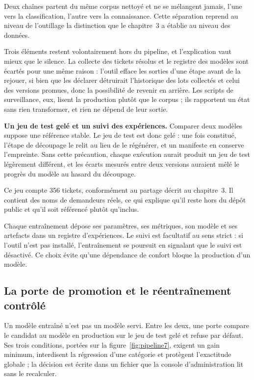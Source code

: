 Deux chaînes partent du même corpus nettoyé et ne se mélangent jamais, l'une vers la
classification, l'autre vers la connaissance. Cette séparation reprend au niveau de l'outillage la
distinction que le chapitre~3 a établie au niveau des données.

Trois éléments restent volontairement hors du pipeline, et l'explication vaut mieux que le silence.
La collecte des tickets résolus et le registre des modèles sont écartés pour une même raison :
l'outil efface les sorties d'une étape avant de la rejouer, si bien que les déclarer détruirait
l'historique des lots collectés et celui des versions promues, donc la possibilité de revenir en
arrière. Les scripts de surveillance, eux, lisent la production plutôt que le corpus ; ils
rapportent un état sans rien transformer, et rien ne dépend de leur sortie.

\textbf{Un jeu de test gelé et un suivi des expériences.} Comparer deux modèles suppose une référence stable. Le jeu de test est donc gelé : une fois
constitué, l'étape de découpage le relit au lieu de le régénérer, et un manifeste en conserve
l'empreinte. Sans cette précaution, chaque exécution aurait produit un jeu de test légèrement
différent, et les écarts mesurés entre deux versions auraient mêlé le progrès du modèle au hasard
du découpage.

Ce jeu compte 356 tickets, conformément au partage décrit au chapitre~3. Il contient des noms de
demandeurs réels, ce qui explique qu'il reste hors du dépôt public et qu'il soit référencé plutôt
qu'inclus.

Chaque entraînement dépose ses paramètres, ses métriques, son modèle et ses artefacts dans un
registre d'expériences. Le suivi est facultatif au sens strict : si l'outil n'est pas installé,
l'entraînement se poursuit en signalant que le suivi est désactivé. Ce choix évite qu'une
dépendance de confort bloque la production d'un modèle.

\subsection{La porte de promotion et le réentraînement contrôlé}

Un modèle entraîné n'est pas un modèle servi. Entre les deux, une porte compare le candidat au
modèle en production sur le jeu de test gelé et refuse par défaut. Ses trois conditions, portées sur
la figure~\ref{fig:pipeline7}, exigent un gain minimum, interdisent la régression d'une catégorie et
protègent l'exactitude globale ; la décision est écrite dans un fichier que la console
d'administration lit sans le recalculer.

